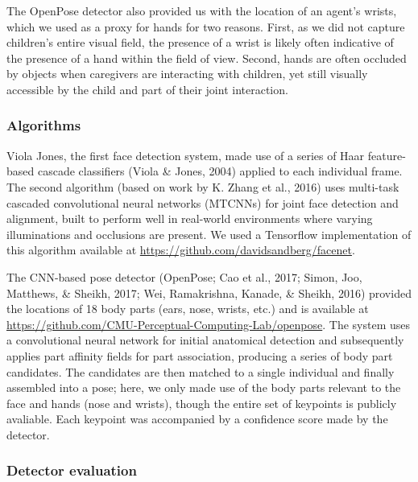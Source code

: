 \documentclass[english,man]{apa6}
\begin{document}
The OpenPose detector also provided us with the location of an agent's
wrists, which we used as a proxy for hands for two reasons. First, as we
did not capture children's entire visual field, the presence of a wrist
is likely often indicative of the presence of a hand within the field of
view. Second, hands are often occluded by objects when caregivers are
interacting with children, yet still visually accessible by the child
and part of their joint interaction.

\subsubsection{Algorithms}\label{algorithms}

Viola Jones, the first face detection system, made use of a series of
Haar feature-based cascade classifiers (Viola \& Jones, 2004) applied to
each individual frame. The second algorithm (based on work by K. Zhang
et al., 2016) uses multi-task cascaded convolutional neural networks
(MTCNNs) for joint face detection and alignment, built to perform well
in real-world environments where varying illuminations and occlusions
are present. We used a Tensorflow implementation of this algorithm
available at \url{https://github.com/davidsandberg/facenet}.

The CNN-based pose detector (OpenPose; Cao et al., 2017; Simon, Joo,
Matthews, \& Sheikh, 2017; Wei, Ramakrishna, Kanade, \& Sheikh, 2016)
provided the locations of 18 body parts (ears, nose, wrists, etc.) and
is available at
\url{https://github.com/CMU-Perceptual-Computing-Lab/openpose}. The
system uses a convolutional neural network for initial anatomical
detection and subsequently applies part affinity fields for part
association, producing a series of body part candidates. The candidates
are then matched to a single individual and finally assembled into a
pose; here, we only made use of the body parts relevant to the face and
hands (nose and wrists), though the entire set of keypoints is publicly
avaliable. Each keypoint was accompanied by a confidence score made by
the detector.

\subsubsection{Detector evaluation}\label{detector-evaluation}
\end{document}
